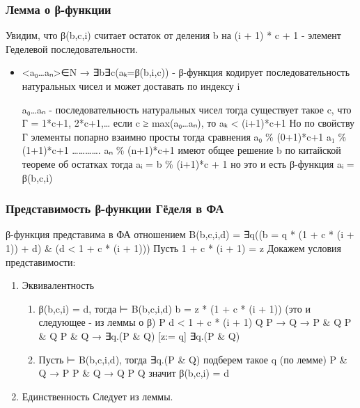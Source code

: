\documentclass[11pt]{article}
\begin{document}
\subsubsection{Лемма о β-функции}
\label{sec-11-3-3}
Увидим, что β(b,c,i) считает остаток от деления b на
(i + 1) * c + 1 - элемент Геделевой последовательности.
\begin{itemize}
\item <a₀\ldots{}aₙ>∈N → ∃b∃c(aₖ=β(b,i,c)) - β-функция кодирует
последовательность натуральных чисел и может
доставать по индексу i

a₀\ldots{}aₙ  - последовательность натуральных чисел
тогда существует такое c, что Г = 1*c+1, 2*c+1,\ldots{}
если c ≥ max(a₀\ldots{}aₙ), то aₖ < (i+1)*c+1
Но по свойству Г элементы попарно взаимно просты
тогда сравнения
a₀ \% (0+1)*c+1
a₁ \% (1+1)*c+1
\ldots{}\ldots{}\ldots{}\ldots{}.
aₙ \% (n+1)*c+1
имеют общее решение b по китайской теореме об остатках
тогда aᵢ = b \% (i+1)*c + 1
но это и есть β-функция
aᵢ = β(b,c,i)
\end{itemize}
\subsubsection{Представимость β-функции Гёделя в ФА}
\label{sec-11-3-4}
β-функция представима в ФА отношением
B(b,c,i,d) = ∃q((b = q * (1 + c * (i + 1)) + d) \& (d < 1 + c * (i + 1)))
Пусть 1 + c * (i + 1) = z
Докажем условия представимости:
\begin{enumerate}
\item Эквивалентность
\begin{enumerate}
\item β(b,c,i) = d, тогда ⊢ B(b,c,i,d)
b = z * (1 + c * (i + 1))    (это и следующее - из леммы о β) P
d < 1 + c * (i + 1)                                           Q
P → Q → P \& Q
P \& Q
P \& Q → ∃q.(P \& Q) [z:= q]
∃q.(P \& Q)
\item Пусть ⊢ B(b,c,i,d), тогда
∃q.(P \& Q)
подберем такое q (по лемме)
P \& Q → P
P \& Q → Q
P
Q
значит β(b,c,i) = d
\end{enumerate}
\item Единственность
Следует из леммы.
\end{enumerate}
\end{document}

